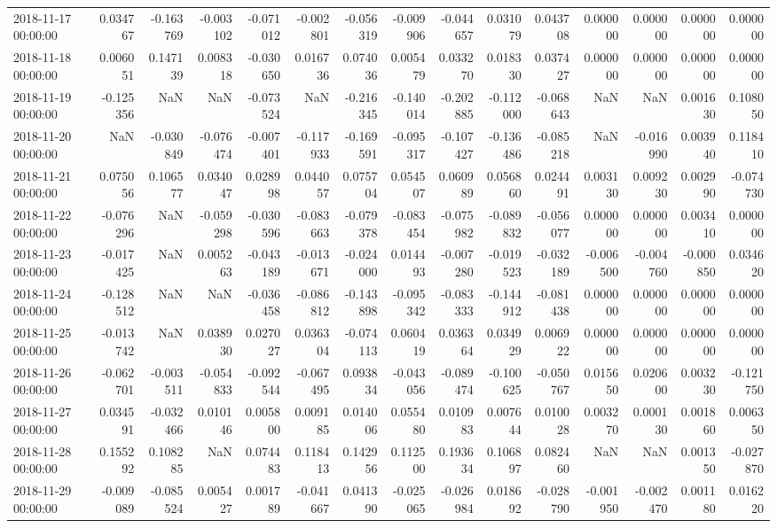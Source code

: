 \begin{tabular}{lrrrrrrrrrrrrrr}
2018-11-17 00:00:00 & 0.034767 & -0.163769 & -0.003102 & -0.071012 & -0.002801 & -0.056319 & -0.009906 & -0.044657 & 0.031079 & 0.043708 & 0.000000 & 0.000000 & 0.000000 & 0.000000 \\
2018-11-18 00:00:00 & 0.006051 & 0.147139 & 0.008318 & -0.030650 & 0.016736 & 0.074036 & 0.005479 & 0.033270 & 0.018330 & 0.037427 & 0.000000 & 0.000000 & 0.000000 & 0.000000 \\
2018-11-19 00:00:00 & -0.125356 & NaN & NaN & -0.073524 & NaN & -0.216345 & -0.140014 & -0.202885 & -0.112000 & -0.068643 & NaN & NaN & 0.001630 & 0.108050 \\
2018-11-20 00:00:00 & NaN & -0.030849 & -0.076474 & -0.007401 & -0.117933 & -0.169591 & -0.095317 & -0.107427 & -0.136486 & -0.085218 & NaN & -0.016990 & 0.003940 & 0.118410 \\
2018-11-21 00:00:00 & 0.075056 & 0.106577 & 0.034047 & 0.028998 & 0.044057 & 0.075704 & 0.054507 & 0.060989 & 0.056860 & 0.024491 & 0.003130 & 0.009230 & 0.002990 & -0.074730 \\
2018-11-22 00:00:00 & -0.076296 & NaN & -0.059298 & -0.030596 & -0.083663 & -0.079378 & -0.083454 & -0.075982 & -0.089832 & -0.056077 & 0.000000 & 0.000000 & 0.003410 & 0.000000 \\
2018-11-23 00:00:00 & -0.017425 & NaN & 0.005263 & -0.043189 & -0.013671 & -0.024000 & 0.014493 & -0.007280 & -0.019523 & -0.032189 & -0.006500 & -0.004760 & -0.000850 & 0.034620 \\
2018-11-24 00:00:00 & -0.128512 & NaN & NaN & -0.036458 & -0.086812 & -0.143898 & -0.095342 & -0.083333 & -0.144912 & -0.081438 & 0.000000 & 0.000000 & 0.000000 & 0.000000 \\
2018-11-25 00:00:00 & -0.013742 & NaN & 0.038930 & 0.027027 & 0.036304 & -0.074113 & 0.060419 & 0.036364 & 0.034929 & 0.006922 & 0.000000 & 0.000000 & 0.000000 & 0.000000 \\
2018-11-26 00:00:00 & -0.062701 & -0.003511 & -0.054833 & -0.092544 & -0.067495 & 0.093834 & -0.043056 & -0.089474 & -0.100625 & -0.050767 & 0.015650 & 0.020600 & 0.003230 & -0.121750 \\
2018-11-27 00:00:00 & 0.034591 & -0.032466 & 0.010146 & 0.005800 & 0.009185 & 0.014006 & 0.055480 & 0.010983 & 0.007644 & 0.010028 & 0.003270 & 0.000130 & 0.001860 & 0.006350 \\
2018-11-28 00:00:00 & 0.155292 & 0.108285 & NaN & 0.074483 & 0.118413 & 0.142956 & 0.112500 & 0.193634 & 0.106897 & 0.082460 & NaN & NaN & 0.001350 & -0.027870 \\
2018-11-29 00:00:00 & -0.009089 & -0.085524 & 0.005427 & 0.001789 & -0.041667 & 0.041390 & -0.025065 & -0.026984 & 0.018692 & -0.028790 & -0.001950 & -0.002470 & 0.001180 & 0.016220 \\

\end{tabular}
